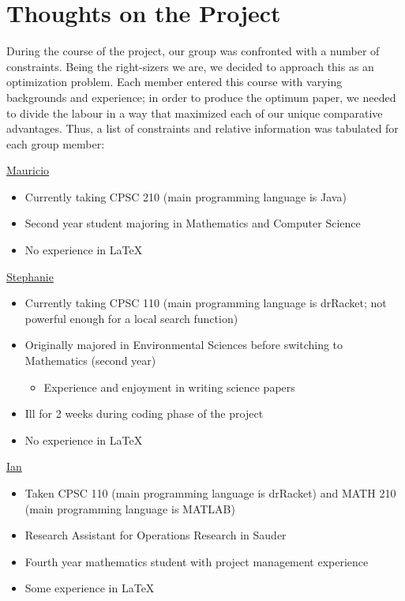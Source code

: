 \documentclass[11pt, oneside]{article}   	%
\begin{document}
\cleardoublepage
\section {Thoughts on the Project}

During the course of the project, our group was confronted with a number of constraints. Being the right-sizers we are, we decided to approach this as an optimization problem. Each member entered this course with varying backgrounds and experience; in order to produce the optimum paper, we needed to divide the labour in a way that maximized each of our unique comparative advantages. Thus, a list of constraints and relative information was tabulated for each group member:

\underline{Mauricio}
\begin{itemize}
    \item Currently taking CPSC 210 (main programming language is Java)
    \item Second year student majoring in Mathematics and Computer Science
    \item No experience in  \LaTeX{}
\end{itemize}

\underline{Stephanie}
\begin{itemize}
    \item Currently taking CPSC 110 (main programming language is drRacket; not powerful enough for a local search function)
    \item Originally majored in Environmental Sciences before switching to Mathematics (second year)
    \begin{itemize}
    	\item Experience and enjoyment in writing science papers
    \end{itemize}
    \item Ill for 2 weeks during coding phase of the project
    \item No experience in  \LaTeX{}
\end{itemize}

\underline{Ian}
\begin{itemize}
    \item Taken CPSC 110 (main programming language is drRacket) and MATH 210 (main programming language is MATLAB)
    \item Research Assistant for Operations Research in Sauder
    \item Fourth year mathematics student with project management experience
    \item Some experience in  \LaTeX{}
\end{itemize}
\end{document}

